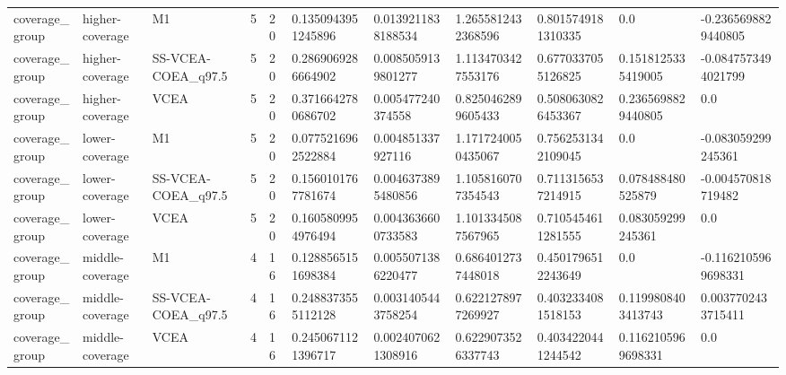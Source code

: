 \begin{landscape}
\begin{longtable}{lllllllllll}
coverage\_group & higher-coverage & M1 & 5 & 20 & 0.1350943951245896 & 0.0139211838188534 & 1.2655812432368596 & 0.8015749181310335 & 0.0 & -0.2365698829440805 \\
coverage\_group & higher-coverage & SS-VCEA-COEA\_q97.5 & 5 & 20 & 0.2869069286664902 & 0.0085059139801277 & 1.1134703427553176 & 0.6770337055126825 & 0.1518125335419005 & -0.0847573494021799 \\
coverage\_group & higher-coverage & VCEA & 5 & 20 & 0.3716642780686702 & 0.005477240374558 & 0.8250462899605433 & 0.5080630826453367 & 0.2365698829440805 & 0.0 \\
coverage\_group & lower-coverage & M1 & 5 & 20 & 0.0775216962522884 & 0.004851337927116 & 1.1717240050435067 & 0.7562531342109045 & 0.0 & -0.083059299245361 \\
coverage\_group & lower-coverage & SS-VCEA-COEA\_q97.5 & 5 & 20 & 0.1560101767781674 & 0.0046373895480856 & 1.1058160707354543 & 0.7113156537214915 & 0.078488480525879 & -0.004570818719482 \\
coverage\_group & lower-coverage & VCEA & 5 & 20 & 0.1605809954976494 & 0.0043636600733583 & 1.1013345087567965 & 0.7105454611281555 & 0.083059299245361 & 0.0 \\
coverage\_group & middle-coverage & M1 & 4 & 16 & 0.1288565151698384 & 0.0055071386220477 & 0.6864012737448018 & 0.4501796512243649 & 0.0 & -0.1162105969698331 \\
coverage\_group & middle-coverage & SS-VCEA-COEA\_q97.5 & 4 & 16 & 0.2488373555112128 & 0.0031405443758254 & 0.6221278977269927 & 0.4032334081518153 & 0.1199808403413743 & 0.0037702433715411 \\
coverage\_group & middle-coverage & VCEA & 4 & 16 & 0.2450671121396717 & 0.0024070621308916 & 0.6229073526337743 & 0.4034220441244542 & 0.1162105969698331 & 0.0 \\
\bottomrule
\end{longtable}
\end{landscape}

